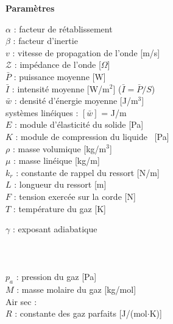 \smallskip
\noindent\begin{minipage}{\columnwidth}
{\footnotesize\textbf{Paramètres}\par}
{\scriptsize\noindent
\begin{minipage}[t]{0.49\columnwidth}\raggedright
  $\alpha$ : facteur de rétablissement \\
  $\beta$ : facteur d'inertie \\
  $v$ : vitesse de propagation de l'onde [m/s] \\
  $\mathcal{Z}$ : impédance de l'onde [$\Omega$] \\
  $\bar P$ : puissance moyenne [W] \\
  $\bar I$ : intensité moyenne [W/m$^2$] \quad ($\bar I = \bar P/S$) \\
  $\bar w$ : densité d'énergie moyenne [J/m$^3$] \\
  \quad systèmes linéiques : $[\bar w]$ = J/m \\[4pt]
  $E$ : module d'élasticité du solide [Pa] \\
  $K$ : module de compression du liquide \ [Pa] \\
  $\rho$ : masse volumique [kg/m$^3$] \\
  $\mu$ : masse linéique [kg/m] \\
  $k_r$ : constante de rappel du ressort [N/m] \\
  $L$ : longueur du ressort [m] \\
  $F$ : tension exercée sur la corde [N] \\
  $T$ : température du gaz [K]
\end{minipage}\hfill
\begin{minipage}[t]{0.49\columnwidth}\raggedright
  $\gamma$ : exposant adiabatique \\
  \quad {} \\
  \quad {} \\
  \quad {} \\
  $p_a$ : pression du gaz [Pa] \\
  $M$ : masse molaire du gaz [kg/mol] \\
  \qquad Air sec :  \\
  $R$ : constante des gaz parfaits [J/(mol$\cdot$K)] \\
  \qquad {} \\

\end{minipage}}
\end{minipage}
